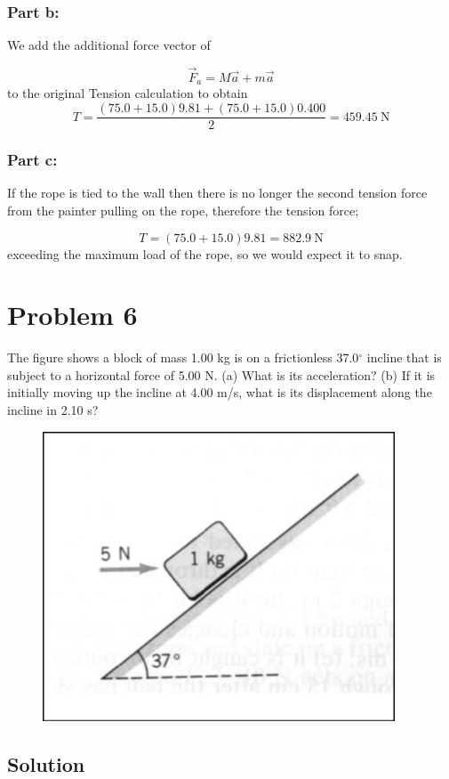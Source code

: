 \documentclass{article}
\begin{document}
\subsubsection*{Part b:}
We add the additional force vector of

\[
	\vec{F}_a = M\vec{a} + m\vec{a}
\]
to the original Tension calculation to obtain
\[
	T = \frac{\left( 75.0 + 15.0 \right)9.81 + \left(75.0 + 15.0\right)0.400}{2} = \boxed{459.45\ \text{N}}
\]

\subsubsection*{Part c:}
If the rope is tied to the wall then there is no longer the second tension force from the painter pulling on the rope, therefore the tension force;

\[
	T = \left( 75.0 + 15.0 \right)9.81 = \boxed{882.9\ \text{N}}
\]
exceeding the maximum load of the rope, so we would expect it to snap.

\section*{Problem 6}
The figure shows a block of mass 1.00 kg is on a frictionless 37.0$^\circ$ incline that is subject to a horizontal force
of 5.00 N. (a) What is its acceleration? (b) If it is initially moving up the incline at 4.00 m/s, what is its
displacement along the incline in 2.10 s?
\begin{figure}[ht]
    \centering
    \includegraphics[scale=.4]{drawing-4.png}
\end{figure}

\subsection*{Solution}
\end{document}
